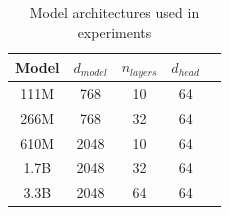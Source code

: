 \begin{table}
  \centering
  \caption{Model architectures used in experiments\label{tab:model_info}}
\begin{tabular}{@{}ccccc@{}}
\toprule
Model & $d_{model}$ & $n_{layers}$ & $d_{head}$ \\ \midrule
111M  & 768    & 10      & 64           \\
266M  & 768    & 32      & 64           \\
610M  & 2048   & 10      & 64           \\
1.7B  & 2048   & 32      & 64           \\
3.3B  & 2048   & 64      & 64           \\ \bottomrule
\end{tabular}
\end{table}
